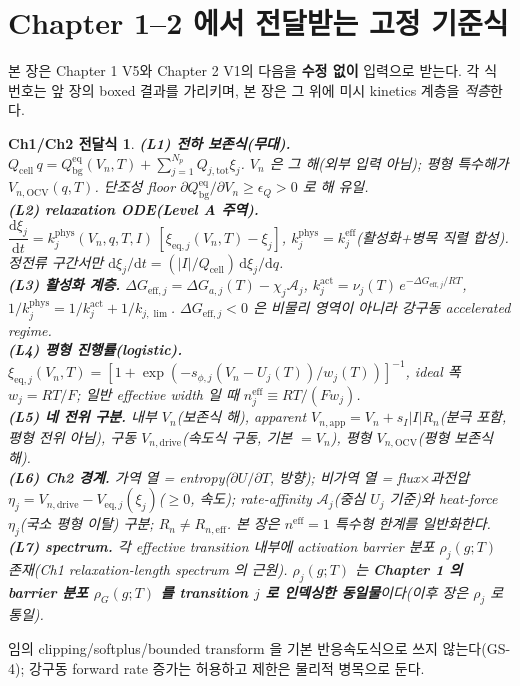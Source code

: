 \documentclass[11pt,a4paper]{article}
\newtheorem*{linkbox}{Ch1/Ch2 전달식}
\newcommand{\dd}{\mathrm{d}}
\newcommand{\eff}{\mathrm{eff}}
\newcommand{\eq}{\mathrm{eq}}
\newcommand{\app}{\mathrm{app}}
\newcommand{\drive}{\mathrm{drive}}
\newcommand{\bg}{\mathrm{bg}}
\newcommand{\cell}{\mathrm{cell}}
\newcommand{\OCV}{\mathrm{OCV}}
\newcommand{\tot}{\mathrm{tot}}
\begin{document}
\section{Chapter 1--2 에서 전달받는 고정 기준식}\label{sec:ch3_inherit}
본 장은 Chapter 1 V5와 Chapter 2 V1의 다음을 \textbf{수정 없이} 입력으로 받는다. 각 식
번호는 앞 장의 boxed 결과를 가리키며, 본 장은 그 위에 미시 kinetics 계층을 \emph{적층}한다.
\begin{linkbox}
\textbf{(L1) 전하 보존식(무대).} $Q_\cell\,q=Q_\bg^{\eq}(V_n,T)+\sum_{j=1}^{N_p}Q_{j,\tot}\xi_j$. $V_n$ 은 그 해(외부
입력 아님); 평형 특수해가 $V_{n,\OCV}(q,T)$. 단조성 floor $\partial Q_\bg^{\eq}/\partial V_n\ge\epsilon_Q>0$ 로 해 유일.\\
\textbf{(L2) relaxation ODE(Level A 주역).} $\dfrac{\dd\xi_j}{\dd t}=k_j^{\mathrm{phys}}(V_n,q,T,I)\,[\xi_{\eq,j}(V_n,T)-\xi_j]$,
$k_j^{\mathrm{phys}}=k_j^{\eff}$(활성화+병목 직렬 합성). 정전류 구간서만 $\dd\xi_j/\dd t=(|I|/Q_\cell)\,\dd\xi_j/\dd q$.\\
\textbf{(L3) 활성화 계층.} $\Delta G_{\eff,j}=\Delta G_{a,j}(T)-\chi_j\mathcal A_j$,
$k_j^{\mathrm{act}}=\nu_j(T)\,e^{-\Delta G_{\eff,j}/RT}$, $1/k_j^{\mathrm{phys}}=1/k_j^{\mathrm{act}}+1/k_{j,\lim}$.
$\Delta G_{\eff,j}<0$ 은 비물리 영역이 아니라 강구동 accelerated regime.\\
\textbf{(L4) 평형 진행률(logistic).} $\xi_{\eq,j}(V_n,T)=[1+\exp(-s_{\phi,j}(V_n-U_j(T))/w_j(T))]^{-1}$, ideal
폭 $w_j=RT/F$; 일반 effective width 일 때 $n_j^{\eff}\equiv RT/(Fw_j)$.\\
\textbf{(L5) 네 전위 구분.} 내부 $V_n$(보존식 해), apparent $V_{n,\app}=V_n+s_I|I|R_n$(분극 포함, 평형 전위
아님), 구동 $V_{n,\drive}$(속도식 구동, 기본 $=V_n$), 평형 $V_{n,\OCV}$(평형 보존식 해).\\
\textbf{(L6) Ch2 경계.} 가역 열 = entropy($\partial U/\partial T$, 방향); 비가역 열 = flux$\times$과전압
$\eta_j=V_{n,\drive}-V_{\eq,j}(\xi_j)$($\ge0$, 속도); rate-affinity $\mathcal A_j$(중심 $U_j$ 기준)와
heat-force $\eta_j$(국소 평형 이탈) 구분; $R_n\ne R_{n,\eff}$. 본 장은 $n^\eff=1$ 특수형 한계를 일반화한다.\\
\textbf{(L7) spectrum.} 각 effective transition 내부에 activation barrier 분포 $\rho_j(g;T)$ 존재(Ch1
relaxation-length spectrum 의 근원). $\rho_j(g;T)$ 는 \textbf{Chapter 1 의 barrier 분포 $\rho_G(g;T)$ 를
transition $j$ 로 인덱싱한 동일물}이다(이후 장은 $\rho_j$ 로 통일).
\end{linkbox}
임의 clipping/softplus/bounded transform 을 기본 반응속도식으로 쓰지 않는다(GS-4); 강구동 forward rate 증가는
허용하고 제한은 물리적 병목으로 둔다.
\end{document}
